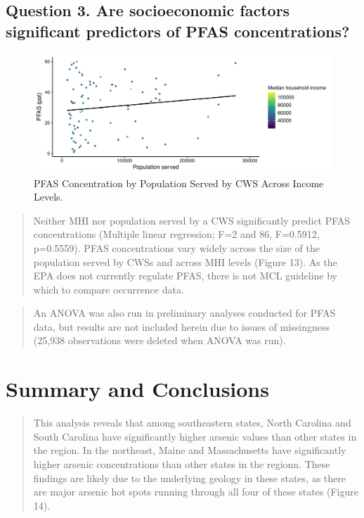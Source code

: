 \documentclass[12pt,]{article}
\begin{document}
\hypertarget{question-3.-are-socioeconomic-factors-significant-predictors-of-pfas-concentrations}{%
\subsection{Question 3. Are socioeconomic factors significant predictors
of PFAS
concentrations?}\label{question-3.-are-socioeconomic-factors-significant-predictors-of-pfas-concentrations}}

\begin{figure}
\centering
\includegraphics{Project_Template_files/figure-latex/figs13-1.pdf}
\caption{PFAS Concentration by Population Served by CWS Across Income
Levels.}
\end{figure}

\begin{quote}
Neither MHI nor population served by a CWS significantly predict PFAS
concentrations (Multiple linear regression; F=2 and 86, F=0.5912,
p=0.5559). PFAS concentrations vary widely across the size of the
population served by CWSs and across MHI levels (Figure 13). As the EPA
does not currently regulate PFAS, there is not MCL guideline by which to
compare occurrence data.
\end{quote}

\begin{quote}
An ANOVA was also run in preliminary analyses conducted for PFAS data,
but results are not included herein due to issues of missingness (25,938
observations were deleted when ANOVA was run).
\end{quote}

\newpage

\hypertarget{summary-and-conclusions}{%
\section{Summary and Conclusions}\label{summary-and-conclusions}}

\begin{quote}
This analysis reveals that among southeastern states, North Carolina and
South Carolina have significantly higher arsenic values than other
states in the region. In the northeast, Maine and Massachusetts have
significantly higher arsenic concentrations than other states in the
regionn. These findings are likely due to the underlying geology in
these states, as there are major arsenic hot spots running through all
four of these states (Figure 14).
\end{quote}
\end{document}
